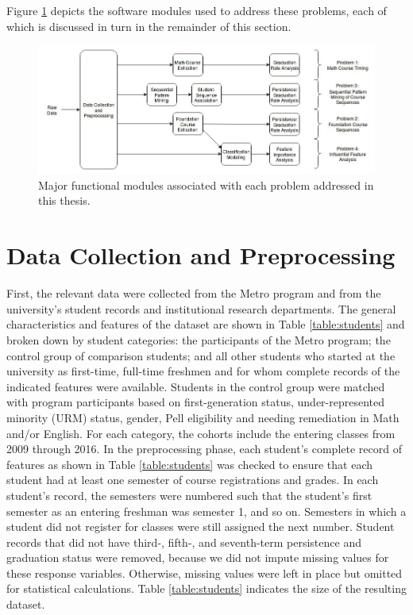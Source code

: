 Figure \ref{modules} depicts the software modules used to address these problems, each of which is discussed in turn in the remainder of this section.

\begin{figure}[htbp]
\centering
\includegraphics[width=\textwidth]{figures/modules.jpg}
\caption{Major functional modules associated with each problem addressed in this thesis.}
\label{modules}
\end{figure}

\section{Data Collection and Preprocessing}

First, the relevant data were collected from the Metro program and from the university's student records and institutional research departments.  The general characteristics and features of the dataset are shown in Table \ref{table:students} and broken down by student categories: the participants of the Metro program; the control group of comparison students; and all other students who started at the university as first-time, full-time freshmen and for whom complete records of the indicated features were available.  Students in the control group were matched with program participants based on first-generation status, under-represented minority (URM) status, gender, Pell eligibility and needing remediation in Math and/or English.  For each category, the cohorts include the entering classes from 2009 through 2016.  In the preprocessing phase, each student's complete record of features as shown in Table \ref{table:students} was checked to ensure that each student had at least one semester of course registrations and grades.  In each student's record, the semesters were numbered such that the student's first semester as an entering freshman was semester 1, and so on.  Semesters in which a student did not register for classes were still assigned the next number.  Student records that did not have third-, fifth-, and seventh-term persistence and graduation status were removed, because we did not impute missing values for these response variables.  Otherwise, missing values were left in place but omitted for statistical calculations.  Table \ref{table:students} indicates the size of the resulting dataset. 

